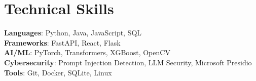 \section{Technical Skills}

\begin{itemize}[leftmargin=0.15in, label={}]
\small{\item{

\textbf{Languages}: Python, Java, JavaScript, SQL \\

\textbf{Frameworks}: FastAPI, React, Flask \\

\textbf{AI/ML}: PyTorch, Transformers, XGBoost, OpenCV \\

\textbf{Cybersecurity}: Prompt Injection Detection, LLM Security, Microsoft Presidio \\

\textbf{Tools}: Git, Docker, SQLite, Linux

}}
\end{itemize}